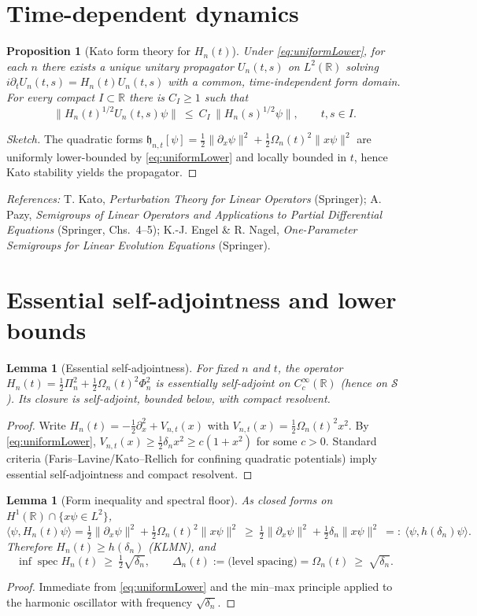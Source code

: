 \documentclass[11pt]{article}
\theoremstyle{plain}
\newtheorem{lemma}[theorem]{Lemma}
\newtheorem{proposition}[theorem]{Proposition}
\theoremstyle{definition}
\theoremstyle{remark}
\newcommand{\R}{\mathbb{R}}
\DeclareMathOperator{\spec}{spec}
\begin{document}
\section{Time-dependent dynamics}\label{sec:dynamics}
\begin{proposition}[Kato form theory for $H_n(t)$]\label{prop:Kato}
Under \eqref{eq:uniformLower}, for each $n$ there exists a unique unitary propagator $U_n(t,s)$ on $L^2(\R)$ solving $i\partial_tU_n(t,s)=H_n(t)U_n(t,s)$ with a common, time-independent form domain. For every compact $I\subset\R$ there is $C_I\ge1$ such that
\[
\|H_n(t)^{1/2}U_n(t,s)\psi\|\ \le\ C_I\,\|H_n(s)^{1/2}\psi\|,\qquad t,s\in I.
\]
\end{proposition}
\begin{proof}[Sketch]
The quadratic forms $\mathfrak h_{n,t}[\psi]=\tfrac12\|\partial_x\psi\|^2+\tfrac12\Omega_n(t)^2\|x\psi\|^2$ are uniformly lower-bounded by \eqref{eq:uniformLower} and locally bounded in $t$, hence Kato stability yields the propagator.
\end{proof}
\noindent\emph{References:} T. Kato, \emph{Perturbation Theory for Linear Operators} (Springer); A. Pazy, \emph{Semigroups of Linear Operators and Applications to Partial Differential Equations} (Springer, Chs.~4--5); K.-J. Engel \& R. Nagel, \emph{One-Parameter Semigroups for Linear Evolution Equations} (Springer).

\section{Essential self-adjointness and lower bounds}\label{sec:essSA}
\begin{lemma}[Essential self-adjointness]\label{lem:essSA}
For fixed $n$ and $t$, the operator $H_n(t)=\tfrac12\Pi_n^2+\tfrac12\Omega_n(t)^2\Phi_n^2$ is essentially self-adjoint on $C_c^\infty(\R)$ (hence on $\mathcal S$). Its closure is self-adjoint, bounded below, with compact resolvent.
\end{lemma}
\begin{proof}
Write $H_n(t)= -\tfrac12\partial_x^2 + V_{n,t}(x)$ with $V_{n,t}(x)=\tfrac12\Omega_n(t)^2x^2$. By \eqref{eq:uniformLower}, $V_{n,t}(x)\ge \tfrac12\delta_n x^2\ge c(1+x^2)$ for some $c>0$. Standard criteria (Faris--Lavine/Kato--Rellich for confining quadratic potentials) imply essential self-adjointness and compact resolvent.
\end{proof}

\begin{lemma}[Form inequality and spectral floor]\label{lem:formBound}
As closed forms on $H^1(\R)\cap\{x\psi\in L^2\}$,
\[
\langle\psi,H_n(t)\psi\rangle=\tfrac12\|\partial_x\psi\|^2+\tfrac12\Omega_n(t)^2\|x\psi\|^2\ \ge\ \tfrac12\|\partial_x\psi\|^2+\tfrac12\delta_n\|x\psi\|^2\ =:\ \langle\psi,h(\delta_n)\psi\rangle.
\]
Therefore $H_n(t)\ge h(\delta_n)$ (KLMN), and
\[
\inf\spec H_n(t)\ \ge\ \tfrac12\sqrt{\delta_n},\qquad \Delta_n(t):=\text{(level spacing)}=\Omega_n(t)\ \ge\ \sqrt{\delta_n}.
\]
\end{lemma}
\begin{proof}
Immediate from \eqref{eq:uniformLower} and the min--max principle applied to the harmonic oscillator with frequency $\sqrt{\delta_n}$.
\end{proof}
\end{document}
